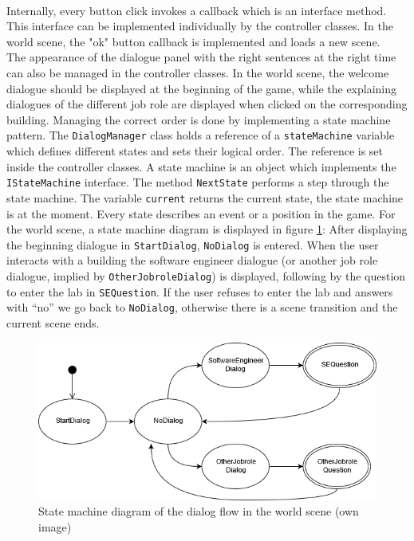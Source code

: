 \\Internally, every button click invokes a callback which is an interface method. This interface can be implemented individually by the controller classes. In the world scene, the "ok" button callback is implemented and loads a new scene. \\The appearance of the dialogue panel with the right sentences at the right time can also be managed in the controller classes. In the world scene, the welcome dialogue should be displayed at the beginning of the game, while the explaining dialogues of the different job role are displayed when clicked on the corresponding building. Managing the correct order is done by implementing a state machine pattern. The \texttt{DialogManager} class holds a reference of a \texttt{stateMachine} variable which defines different states and sets their logical order. The reference is set inside the controller classes. A state machine is an object which implements the \texttt{IStateMachine} interface. The method \texttt{NextState} performs a step through the state machine. The variable \texttt{current} returns the current state, the state machine is at the moment. Every state describes an event or a position in the game. For the world scene, a state machine diagram is displayed in figure \ref{fig:state-machine}: After displaying the beginning dialogue in \texttt{StartDialog}, \texttt{NoDialog} is entered. When the user interacts with a building the software engineer dialogue (or another job role dialogue, implied by \texttt{OtherJobroleDialog}) is displayed, following by the question to enter the lab in \texttt{SEQuestion}. If the user refuses to enter the lab and answers with ``no'' we go back to \texttt{NoDialog}, otherwise there is a scene transition and the current scene ends.\\
\begin{figure}[h]
  \includegraphics[width=14cm]{kapitel/dialog-state-diagram.png}
  \centering
  \caption{State machine diagram of the dialog flow in the world scene (own image)}
  \label{fig:state-machine}
\end{figure}

